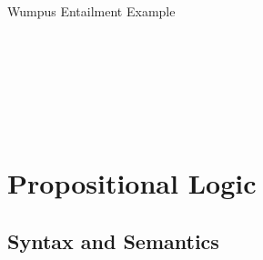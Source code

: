 \documentclass[14pt]{beamer}
\begin{document}
\begin{frame}{Wumpus Entailment Example}
\begin{columns}
\begin{column}{0.6\textwidth}
%
\end{column}
\begin{column}{0.35\textwidth}
 \\[1em]
 \\
 \\[1em]
 \\
\end{column}
\end{columns}
\end{frame}


\section{Propositional Logic}
\subsection{Syntax and Semantics}
\end{document}
